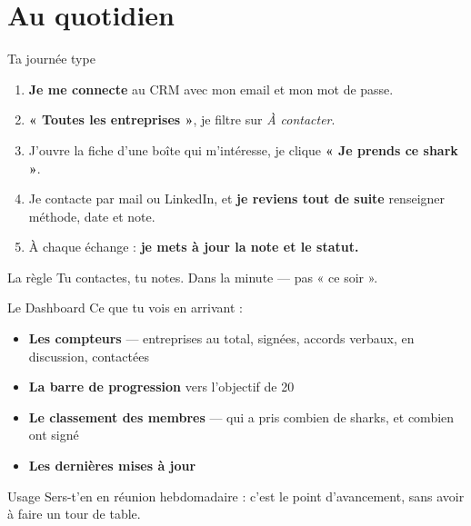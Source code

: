 \documentclass[aspectratio=169,11pt]{beamer}
\newcommand{\cle}[1]{\textbf{\textcolor{noirApp}{#1}}}
\begin{document}
\section{Au quotidien}

\begin{frame}{Ta journée type}
  \begin{enumerate}
    \item \cle{Je me connecte} au CRM avec mon email et mon mot de passe.
    \item \cle{« Toutes les entreprises »}, je filtre sur \emph{À contacter}.
    \item J'ouvre la fiche d'une boîte qui m'intéresse, je clique
          \cle{« Je prends ce shark »}.
    \item Je contacte par mail ou LinkedIn, et \cle{je reviens tout de suite}
          renseigner méthode, date et note.
    \item À chaque échange : \cle{je mets à jour la note et le statut.}
  \end{enumerate}

  \vfill
  \begin{block}{La règle}
    Tu contactes, tu notes. Dans la minute --- pas « ce soir ».
  \end{block}
\end{frame}

\begin{frame}{Le Dashboard}
  Ce que tu vois en arrivant :

  \begin{itemize}
    \item \cle{Les compteurs} --- entreprises au total, signées, accords
          verbaux, en discussion, contactées
    \item \cle{La barre de progression} vers l'objectif de 20
    \item \cle{Le classement des membres} --- qui a pris combien de sharks, et
          combien ont signé
    \item \cle{Les dernières mises à jour}
  \end{itemize}

  \vfill
  \begin{block}{Usage}
    Sers-t'en en réunion hebdomadaire : c'est le point d'avancement, sans avoir
    à faire un tour de table.
  \end{block}
\end{frame}
\end{document}
